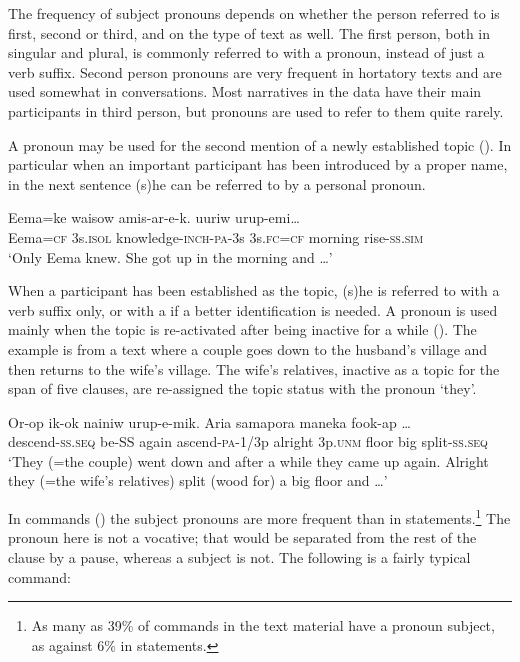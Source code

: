 The frequency of subject pronouns depends on whether the person referred to is first, second or third, and on the type of text as well. The first person, both in singular and plural, is commonly referred to with a pronoun, instead of just a verb suffix. Second person pronouns are very frequent in hortatory texts and are used somewhat in conversations. Most narratives in the data have their main participants in third person, but pronouns are used to refer to them quite rarely. 

A pronoun may be used for the second mention of a newly established topic (). In particular when an important participant has been introduced by a proper name, in the next sentence (s)he can be referred to by a personal pronoun. 

\ea%
\label{ex:3:x1867}
\gll Eema=ke waisow amis-ar-e-k.  uuriw urup-emi{\dots}\\
Eema=\textsc{cf} 3s.\textsc{isol} knowledge-\textsc{inch}-\textsc{pa}-3s 3s.\textsc{fc}=\textsc{cf} morning rise-\textsc{ss}.\textsc{sim}\\
\glt`Only Eema knew. She got up in the morning and {\dots}'
\z

When a participant has been established as the topic, (s)he is referred to with a verb suffix only, or with a  if a better identification is needed. A pronoun is used mainly when the topic is re-activated after being inactive for a while (). The example  is from a text where a couple goes down to the husband's village and then returns to the wife's village. The wife's relatives, inactive as a topic for the span of five clauses, are re-assigned the topic status with the pronoun  `they'. 

\ea%
\label{ex:3:x1922}
\gll Or-op ik-ok nainiw urup-e-mik. Aria  samapora maneka fook-ap {\dots}\\
descend-\textsc{ss}.\textsc{seq} be-SS again ascend-\textsc{pa}-1/3p alright 3p.\textsc{unm} floor big split-\textsc{ss}.\textsc{seq} \\
\glt`They (=the couple) went down and after a while they came up again. Alright they (=the wife's relatives) split (wood for) a big floor and {\dots}'
\z

In commands () the subject pronouns are more frequent than in statements.\footnote{As many as 39\% of commands in the text material have a pronoun subject, as against 6\% in statements.} The pronoun here is not a vocative; that would be separated from the rest of the clause by a pause, whereas a subject is not. The following is a fairly typical command:

